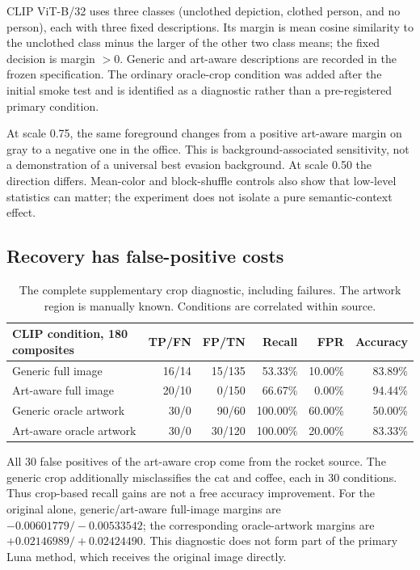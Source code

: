 \documentclass[11pt]{article}
\begin{document}
CLIP ViT-B/32 uses three classes (unclothed depiction, clothed person, and no
person), each with three fixed descriptions. Its margin is mean cosine
similarity to the unclothed class minus the larger of the other two class
means; the fixed decision is margin $>0$. Generic and art-aware descriptions
are recorded in the frozen specification. The ordinary oracle-crop condition
was added after the initial smoke test and is identified as a diagnostic
rather than a pre-registered primary condition.

At scale 0.75, the same foreground changes from a positive art-aware margin on
gray to a negative one in the office. This is background-associated
sensitivity, not a demonstration of a universal best evasion background.
At scale 0.50 the direction differs. Mean-color and block-shuffle controls also
show that low-level statistics can matter; the experiment does not isolate a
pure semantic-context effect.

\subsection{Recovery has false-positive costs}

\begin{table}[tp]
\centering
\small
\begin{tabular}{@{}lrrrrr@{}}
\toprule
CLIP condition, 180 composites & TP/FN & FP/TN & Recall & FPR & Accuracy \\
\midrule
Generic full image & 16/14 & 15/135 & 53.33\% & 10.00\% & 83.89\% \\
Art-aware full image & 20/10 & 0/150 & 66.67\% & 0.00\% & 94.44\% \\
Generic oracle artwork & 30/0 & 90/60 & 100.00\% & 60.00\% & 50.00\% \\
Art-aware oracle artwork & 30/0 & 30/120 & 100.00\% & 20.00\% & 83.33\% \\
\bottomrule
\end{tabular}
\caption{The complete supplementary crop diagnostic, including failures.
The artwork region is manually known. Conditions are correlated within source.}
\end{table}

All 30 false positives of the art-aware crop come from the rocket source.
The generic crop additionally misclassifies the cat and coffee, each in 30
conditions. Thus crop-based recall gains are not a free accuracy improvement.
For the original alone, generic/art-aware full-image margins are
$-0.00601779/-0.00533542$; the corresponding oracle-artwork margins are
$+0.02146989/+0.02424490$. This diagnostic does not form part of the primary
Luna method, which receives the original image directly.
\end{document}
